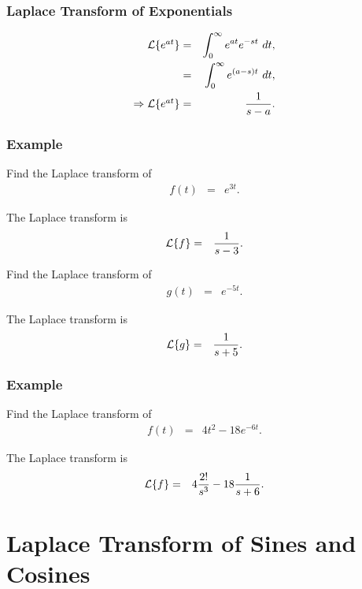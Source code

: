 \begin{frame}
  \frametitle{Laplace Transform of Exponentials}

  \begin{eqnarray*}
    \laplace{e^{at}} & = & \int^\infty_0 e^{at} e^{-st} ~ dt, \\
    & = & \int^\infty_0 e^{(a-s)t} ~ dt, \\
    \Rightarrow \laplace{e^{at}} & = & \frac{1}{s-a}.
  \end{eqnarray*}

\end{frame}


\begin{frame}
  \frametitle{Example}

  Find the Laplace transform of 
  \begin{eqnarray*}
    f(t) & = & e^{3t}.
  \end{eqnarray*}

  The Laplace transform is
  \begin{eqnarray*}
    \laplace{f} & = & \frac{1}{s-3}.
  \end{eqnarray*}

  {
    Find the Laplace transform of 
    \begin{eqnarray*}
      g(t) & = & e^{-5t}.
    \end{eqnarray*}

    The Laplace transform is
    \begin{eqnarray*}
      \laplace{g} & = & \frac{1}{s+5}.
    \end{eqnarray*}
  }


\end{frame}


\begin{frame}
  \frametitle{Example}

  Find the Laplace transform of 
  \begin{eqnarray*}
    f(t) & = & 4t^2 - 18 e^{-6t}.
  \end{eqnarray*}

  The Laplace transform is
  \begin{eqnarray*}
    \laplace{f} & = & 4 \frac{2!}{s^3} - 18 \frac{1}{s+6}.
  \end{eqnarray*}

\end{frame}


\section{Laplace Transform of Sines and Cosines}

